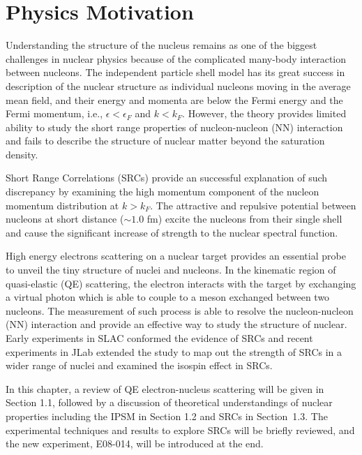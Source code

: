 \chapter{Physics Motivation}
 Understanding the structure of the nucleus remains as one of the biggest challenges in nuclear physics because of the complicated many-body interaction between nucleons. The independent particle shell model has its great success in description of the nuclear structure as individual nucleons moving in the average mean field, and their energy and momenta are below the Fermi energy and the Fermi momentum, i.e., $\epsilon < \epsilon_{F}$ and $k<k_{F}$. However, the theory provides limited ability to study the short range properties of nucleon-nucleon (NN) interaction and fails to describe the structure of nuclear matter beyond the saturation density. 
 
 Short Range Correlations (SRCs) provide an successful explanation of such discrepancy by examining the high momentum component of the nucleon momentum distribution at $k>k_{F}$. The attractive and repulsive potential between nucleons at short distance ($\sim 1.0$ fm) excite the nucleons from their single shell and cause the significant increase of strength to the nuclear spectral function. 

High energy electrons scattering on a nuclear target provides an essential probe to unveil the tiny structure of nuclei and nucleons. In the kinematic region of quasi-elastic (QE) scattering, the electron interacts with the target by exchanging a virtual photon which is able to couple to a meson exchanged between two nucleons. The measurement of such process is able to resolve the nucleon-nucleon (NN) interaction and provide an effective way to study the structure of nuclear. Early experiments in SLAC conformed the evidence of SRCs and recent experiments in JLab extended the study to map out the strength of SRCs in a wider range of nuclei and examined the isospin effect in SRCs. 

 In this chapter, a review of QE electron-nucleus scattering will be given in Section 1.1, followed by a discussion of theoretical understandings of nuclear properties including the IPSM in Section 1.2 and SRCs in Section~1.3. The experimental techniques and results to explore SRCs will be briefly reviewed, and the new experiment, E08-014, will be introduced at the end.




